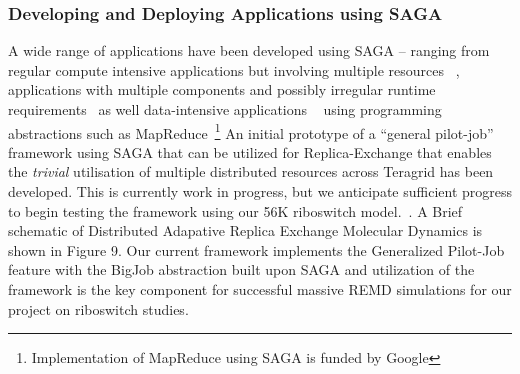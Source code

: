\documentclass[a4paper,10pt]{article}
\begin{document}
\subsubsection*{Developing and Deploying Applications using SAGA}

A wide range of applications have been developed using SAGA -- ranging from regular compute intensive applications but involving multiple resources ~\cite{saga_escience07, gmac, REMD-PhilTranA2009}, applications with multiple components and possibly irregular runtime requirements~\cite{saga_loosely_coupled, teragrid08} as well data-intensive applications ~\cite{saga_data_intensive, saga_grid_cloud} using programming abstractions such as MapReduce~\footnote{Implementation of MapReduce using SAGA is funded by Google} An initial prototype of a ``general pilot-job'' framework using SAGA that can be utilized for Replica-Exchange that enables the {\it trivial} utilisation of multiple distributed resources across Teragrid has been developed. This is currently work in progress, but we anticipate sufficient progress to begin testing the framework using our 56K riboswitch model.~\cite{REMD-PhilTranA2009}. A Brief schematic of Distributed Adapative Replica Exchange Molecular Dynamics is shown in Figure 9.  Our current framework implements the Generalized Pilot-Job feature with the BigJob abstraction built upon SAGA and utilization of the framework is the key component for successful massive REMD simulations for our project on riboswitch studies.

\end{document}
